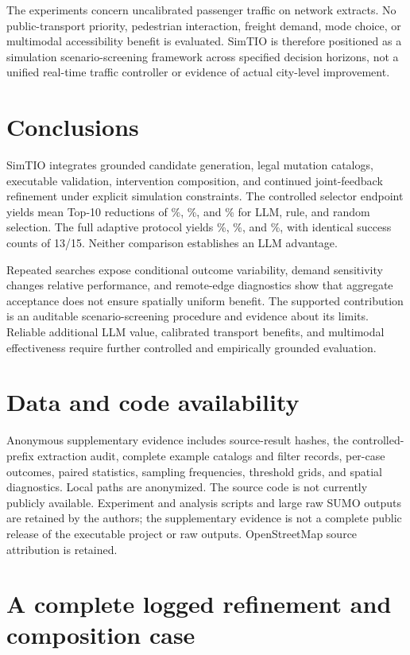 \documentclass[11pt]{article}
\begin{document}
The experiments concern uncalibrated passenger traffic on network extracts. No public-transport priority, pedestrian interaction, freight demand, mode choice, or multimodal accessibility benefit is evaluated. SimTIO is therefore positioned as a simulation scenario-screening framework across specified decision horizons, not a unified real-time traffic controller or evidence of actual city-level improvement.

\section{Conclusions}\label{sec:conclusions}
SimTIO integrates grounded candidate generation, legal mutation catalogs, executable validation, intervention composition, and continued joint-feedback refinement under explicit simulation constraints. The controlled selector endpoint yields mean Top-10 reductions of \StrictLLMTop\%, \StrictRuleTop\%, and \StrictRandomTop\% for LLM, rule, and random selection. The full adaptive protocol yields \WideLLMTop\%, \WideRuleTop\%, and \WideRandomTop\%, with identical success counts of 13/15. Neither comparison establishes an LLM advantage.

Repeated searches expose conditional outcome variability, demand sensitivity changes relative performance, and remote-edge diagnostics show that aggregate acceptance does not ensure spatially uniform benefit. The supported contribution is an auditable scenario-screening procedure and evidence about its limits. Reliable additional LLM value, calibrated transport benefits, and multimodal effectiveness require further controlled and empirically grounded evaluation.

\section*{Data and code availability}
Anonymous supplementary evidence includes source-result hashes, the controlled-prefix extraction audit, complete example catalogs and filter records, per-case outcomes, paired statistics, sampling frequencies, threshold grids, and spatial diagnostics. Local paths are anonymized. The source code is not currently publicly available. Experiment and analysis scripts and large raw SUMO outputs are retained by the authors; the supplementary evidence is not a complete public release of the executable project or raw outputs. OpenStreetMap source attribution is retained.

\appendix
\section{A complete logged refinement and composition case}\label{app:trace}

\end{document}

